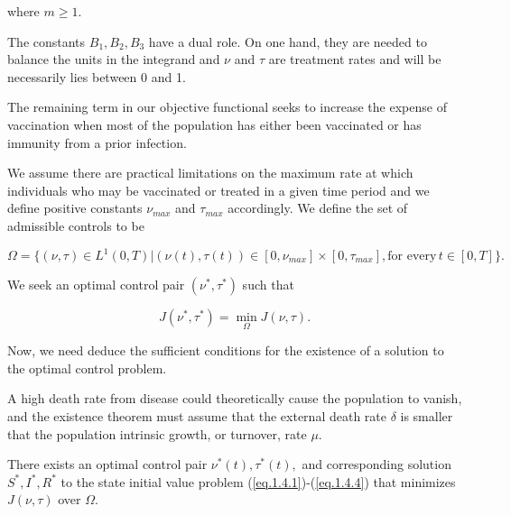 where $m \geq 1$.

The constants $B_1,B_2,B_3$ have a dual role. On one hand, they are needed to balance the units in the integrand and $\nu$ and $\tau$ are treatment rates and will be necessarily lies between 0 and 1.

The remaining term in our objective functional seeks to increase the expense of vaccination when most of the population has either been vaccinated or has immunity from a prior infection.

We assume there are practical limitations on the maximum rate at which individuals who may be vaccinated or treated in a given time period and we define positive constants $\nu_{max}$ and $\tau_{max}$ accordingly.
We define the set of admissible controls to be 

\begin{equation}\label{eq.1.4.6}
\Omega =\{(\nu,\tau)\in L^1(0,T) |  (\nu (t), \tau (t))\in [0,\nu_{max}]\times [0,\tau_{max}], \mbox{for every}\, t\in [0,T]\}.
\end{equation}

We seek an optimal control pair $(\nu^*,\tau^*)$ such that

\begin{equation}\label{eq.1.4.7}
J(\nu^*,\tau^*)=\min_{\Omega}J(\nu,\tau).
\end{equation}

Now, we need deduce the sufficient conditions for the existence of a solution to the optimal control problem.

A high death rate from disease could theoretically cause the population to vanish, and the existence theorem must assume that the external death rate $\delta$ is smaller that the population intrinsic growth, or turnover, rate $\mu$.

\begin{theorem}\label{Teo.Ex.Ap}
There exists an optimal control pair $\nu^*(t),\tau^*(t),$ and corresponding solution $S^*,I^*,R^*$ to the state initial value problem (\ref{eq.1.4.1})-(\ref{eq.1.4.4}) that minimizes $J(\nu,\tau)$ over $\Omega$.
\end{theorem}


